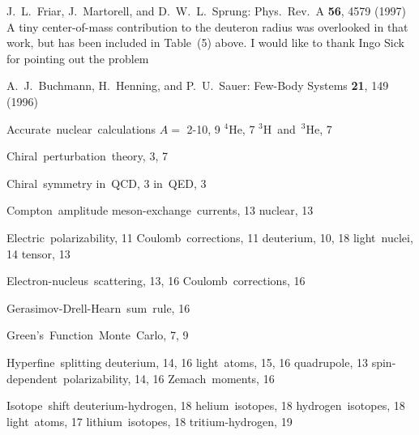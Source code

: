 \documentclass{svmult}
\begin{document}
\begin{thebibliography}{999}
 J.\ L.\ Friar, J.\ Martorell, and D.\ W.\ L.\ Sprung: Phys.\ Rev.\
A {\bf 56}, 4579 (1997) A tiny center-of-mass contribution to the deuteron
radius was overlooked in that work, but has been included in Table~(5) above. I
would like to thank Ingo Sick for pointing out the problem

 A.\ J.\ Buchmann, H.\ Henning, and P.\ U.\ Sauer: Few-Body 
Systems {\bf 21}, 149 (1996)

\end{thebibliography}
\label{04_}
\begin{theindex}

  \item Accurate~nuclear~calculations
    \subitem $A=$ 2-10, 9
    \subitem $^4$He, 7
    \subitem $^3$H~and~$^3$He, 7

  \indexspace

  \item Chiral~perturbation~theory, 3, 7
  \item Chiral~symmetry
    \subitem in~QCD, 3
    \subitem in~QED, 3
  \item Compton~amplitude
    \subitem meson-exchange~currents, 13
    \subitem nuclear, 13

  \indexspace

  \item Electric~polarizability, 11
    \subitem Coulomb~corrections, 11
    \subitem deuterium, 10, 18
    \subitem light~nuclei, 14
    \subitem tensor, 13
  \item Electron-nucleus~scattering, 13, 16
    \subitem Coulomb~corrections, 16

  \indexspace

  \item Gerasimov-Drell-Hearn~sum~rule, 16
  \item Green's~Function~Monte~Carlo, 7, 9

  \indexspace

  \item Hyperfine~splitting
    \subitem deuterium, 14, 16
    \subitem light~atoms, 15, 16
    \subitem quadrupole, 13
    \subitem spin-dependent~polarizability, 14, 16
    \subitem Zemach~moments, 16

  \indexspace

  \item Isotope~shift
    \subitem deuterium-hydrogen, 18
    \subitem helium~isotopes, 18
    \subitem hydrogen~isotopes, 18
    \subitem light~atoms, 17
    \subitem lithium~isotopes, 18
    \subitem tritium-hydrogen, 19


\end{theindex}
\end{document}
